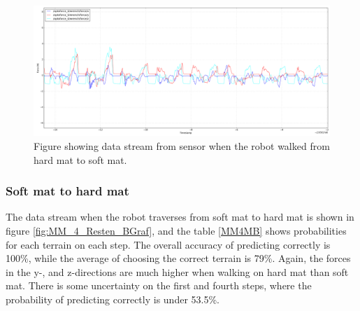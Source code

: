\documentclass[USenglish]{ifimaster}  %
\begin{document}
	
	
	\begin{figure}[h]
		\centering
		\includegraphics[width=\textwidth,height=\textheight,keepaspectratio]{Figures/MB3MM}
		\caption{Figure showing data stream from sensor when the robot walked from hard mat to soft mat.}
		\label{fig:hardmatSoftMat}
	\end{figure}
	
	\begin{table}[h]
		\centering
		\caption{The table showing probability of each terrain per step walking from hard mat to soft mat. Marked green represent correct prediction and correct terrain, red represent wrong prediction and yellow is the correct prediction if it got wrong.}
		\label{hardmatSoftMat}
	\end{table}
	\FloatBarrier
	\clearpage
	
\subsubsection{Soft mat to hard mat}
The data stream when the robot traverses from soft mat to hard mat is shown in figure \ref{fig:MM_4_Resten_BGraf}, and the table \ref{MM4MB} shows probabilities for each terrain on each step. The overall accuracy of predicting correctly is 100\%, while the average of choosing the correct terrain is 79\%. Again, the forces in the y-, and z-directions are much higher when walking on hard mat than soft mat. There is some uncertainty on the first and fourth steps, where the probability of predicting correctly is under 53.5\%.
\end{document}
